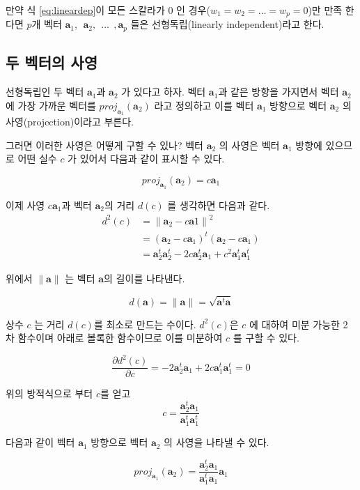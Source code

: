 \documentclass[
]{book}
\newcommand{\pardiff}[2]{\frac{\partial #1}{\partial #2 }}
\newcommand{\norm}[1]{\left\lVert#1\right\rVert}
\theoremstyle{definition}
\theoremstyle{definition}
\theoremstyle{definition}
\theoremstyle{remark}
\begin{document}
만약 식 \eqref{eq:lineardep}이 모든 스칼라가 0 인 경우(\(w_1=w_2=\dots=w_p=0\))만 만족 한다면 \(p\)개 벡터 \(\bm a_1, ~~ \bm a_2, ~~\dots ~~, \bm a_p\) 들은 선형독립(linearly independent)라고 한다.

\hypertarget{uxb450-uxbca1uxd130uxc758-uxc0acuxc601}{%
\subsection{두 벡터의 사영}\label{uxb450-uxbca1uxd130uxc758-uxc0acuxc601}}

선형독립인 두 벡터 \(\bm a_1\)과 \(\bm a_2\) 가 있다고 하자. 벡터 \(\bm a_1\)과 같은 방향을 가지면서 벡터 \(\bm a_2\)에 가장 가까운 벡터를 \(proj_{\bm a_1} (\bm a_2)\) 라고 정의하고 이를 벡터 \(\bm a_1\) 방향으로 벡터 \(\bm a_2\) 의 사영(projection)이라고 부른다.

그러면 이러한 사영은 어떻게 구할 수 있나? 벡터 \(\bm a_2\) 의 사영은 벡터 \(\bm a_1\) 방향에 있으므로 어떤 실수 \(c\) 가 있어서 다음과 같이 표시할 수 있다.

\[ proj_{\bm a_1} (\bm a_2) =  c \bm a_1 \]

이제 사영 \(c \bm a_1\)과 벡터 \(\bm a_2\)의 거리 \(d(c)\) 를 생각하면 다음과 같다.
\begin{align*}
d^2(c) & = \norm{\bm a_2 - c \bm a1}^2 \\
   & = (\bm a_2 - c \bm a_1)^t(\bm a_2 - c \bm a_1) \\
   & = \bm a^t_2 \bm a^t_2 -2 c \bm a_2^t \bm a_1 + c^2 \bm a^t_1 \bm a^t_1
\end{align*}

위에서 \(\norm{\bm a}\) 는 벡터 \(\bm a\)의 길이를 나타낸다.

\[ d(\bm a) = \norm{\bm a} = \sqrt{\bm a^t \bm a} \]

상수 \(c\) 는 거리 \(d(c)\)를 최소로 만드는 수이다. \(d^2(c)\)은 \(c\) 에 대하여 미분 가능한 2차 함수이며 아래로 볼록한 함수이므로 이를 미분하여 \(c\) 를 구할 수 있다.

\[ \pardiff{d^2(c)}{c} = - 2\bm a_2^t \bm a_1 + 2c \bm a^t_1 \bm a^t_1 =0 \]

위의 방적식으로 부터 \(c\)를 얻고
\[ c= \frac{\bm a_2^t \bm a_1  }{\bm a^t_1 \bm a^t_1} \]

다음과 같이 벡터 \(\bm a_1\) 방향으로 벡터 \(\bm a_2\) 의 사영을 나타낼 수 있다.

\begin{equation} 
proj_{\bm a_1} (\bm a_2) = \frac{ \bm a_2^t \bm a_1} {\bm a_1^t \bm a_1} \bm a_1
\label{eq:proj1}
\end{equation}
\end{document}
